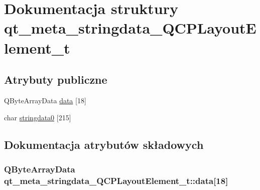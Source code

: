 \hypertarget{structqt__meta__stringdata___q_c_p_layout_element__t}{}\section{Dokumentacja struktury qt\+\_\+meta\+\_\+stringdata\+\_\+\+Q\+C\+P\+Layout\+Element\+\_\+t}
\label{structqt__meta__stringdata___q_c_p_layout_element__t}
\subsection*{Atrybuty publiczne}
\begin{DoxyCompactItemize}
\item 
Q\+Byte\+Array\+Data \hyperlink{structqt__meta__stringdata___q_c_p_layout_element__t_aa6e9ae146c405cc7662ce88d1aaa7569}{data} \mbox{[}18\mbox{]}
\item 
char \hyperlink{structqt__meta__stringdata___q_c_p_layout_element__t_a52a85794683573e29541c60c3cd4eefb}{stringdata0} \mbox{[}215\mbox{]}
\end{DoxyCompactItemize}


\subsection{Dokumentacja atrybutów składowych}
\subsubsection[{\texorpdfstring{data}{data}}]{\setlength{\rightskip}{0pt plus 5cm}Q\+Byte\+Array\+Data qt\+\_\+meta\+\_\+stringdata\+\_\+\+Q\+C\+P\+Layout\+Element\+\_\+t\+::data\mbox{[}18\mbox{]}}\hypertarget{structqt__meta__stringdata___q_c_p_layout_element__t_aa6e9ae146c405cc7662ce88d1aaa7569}{}\label{structqt__meta__stringdata___q_c_p_layout_element__t_aa6e9ae146c405cc7662ce88d1aaa7569}
